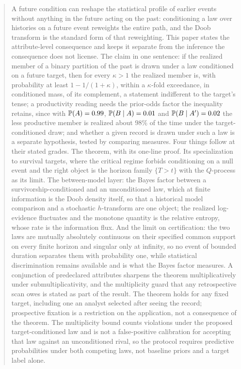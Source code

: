 \begin{abstract}
A future condition can reshape the statistical profile of earlier events
without anything in the future acting on the past: conditioning a law over
histories on a future event reweights the entire path, and the Doob
transform is the standard form of that reweighting. This paper states the
attribute-level consequence and keeps it separate from the inference the
consequence does not license. The claim in one sentence: if the realized
member of a binary partition of the past is drawn under a law conditioned
on a future target, then for every $\kappa>1$ the realized member is, with
probability at least $1-1/(1+\kappa)$, within a $\kappa$-fold exceedance, in conditioned mass, of its complement, a statement indifferent to the target's tense; a productivity reading needs the prior-odds factor the inequality retains, since with $\PP(A) = 0.99$, $\PP(B \mid A) = 0.01$ and $\PP(B \mid A') = 0.02$ the less productive member is realized about $98\%$ of the time under the target-conditioned draw; and whether a given record is drawn under such a law is a
separate hypothesis, tested by comparing measures. Four things follow at
their stated grades. The theorem, with its one-line proof. Its
specialization to survival targets, where the critical regime forbids
conditioning on a null event and the right object is the horizon family
$\{T>t\}$ with the $Q$-process as its limit. The between-model layer: the
Bayes factor between a survivorship-conditioned and an unconditioned law,
which at finite information is the Doob density itself, so that a
historical model comparison and a stochastic $h$-transform are one object;
the realized log-evidence fluctuates and the monotone quantity is the
relative entropy, whose rate is the information flux. And the limit on
certification: the two laws are mutually absolutely continuous on their specified common support on every finite horizon and singular only at infinity, so no event of bounded
duration separates them with probability one, while statistical
discrimination remains available and is what the Bayes factor measures.
A conjunction of predeclared attributes sharpens the theorem
multiplicatively under submultiplicativity, and the multiplicity guard
that any retrospective scan owes is stated as part of the result. The theorem holds for any fixed target, including one an analyst selected after seeing the record; prospective fixation is a restriction on the application, not a consequence of the theorem. The multiplicity bound counts violations under the proposed target-conditioned law and is not a false-positive calibration for accepting that law against an unconditioned rival, so the protocol requires predictive probabilities under both competing laws, not baseline priors and a target label alone.
\end{abstract}

